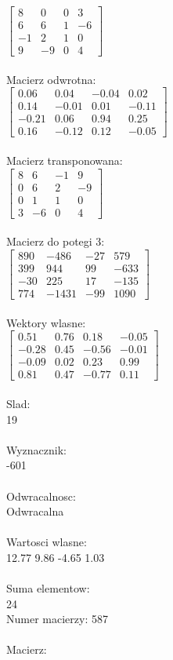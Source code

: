 \documentclass[a4paper,12pt]{article}
\begin{document}
$\begin{bmatrix} 8&0&0&3\\6&6&1&-6\\-1&2&1&0\\9&-9&0&4 \end{bmatrix}$
\\
\\
Macierz odwrotna:\\

$\begin{bmatrix} 0.06&0.04&-0.04&0.02\\0.14&-0.01&0.01&-0.11\\-0.21&0.06&0.94&0.25\\0.16&-0.12&0.12&-0.05 \end{bmatrix}$
\\
\\
Macierz transponowana:\\

$\begin{bmatrix} 8&6&-1&9\\0&6&2&-9\\0&1&1&0\\3&-6&0&4 \end{bmatrix}$
\\
\\
Macierz do potegi 3:\\

$\begin{bmatrix} 890&-486&-27&579\\399&944&99&-633\\-30&225&17&-135\\774&-1431&-99&1090 \end{bmatrix}$
\\
\\
Wektory wlasne:\\

$\begin{bmatrix} 0.51&0.76&0.18&-0.05\\-0.28&0.45&-0.56&-0.01\\-0.09&0.02&0.23&0.99\\0.81&0.47&-0.77&0.11 \end{bmatrix}$
\\
\\
Slad:\\
19
\\
\\
Wyznacznik:\\
-601
\\
\\
Odwracalnosc:\\
Odwracalna
\\
\\
Wartosci wlasne:\\
12.77 9.86 -4.65 1.03
\\
\\
Suma elementow:\\
24
\\
\newpage
Numer macierzy:
587
\\
\\
Macierz:\\
\end{document}
